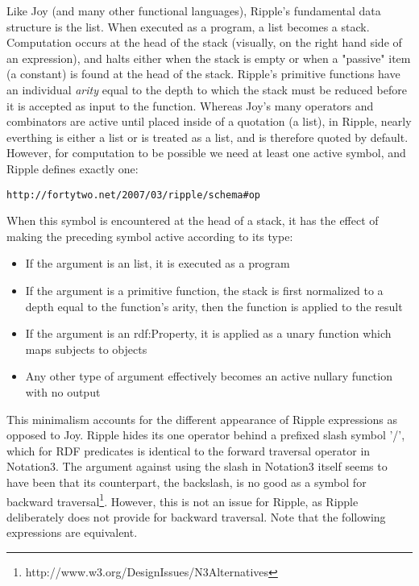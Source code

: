 \documentclass[runningheads]{llncs}
\begin{document}
Like Joy (and many other functional languages), Ripple's fundamental data structure is the list.  When executed as a program, a list becomes a stack.  Computation occurs at the head of the stack (visually, on the right hand side of an expression), and halts either when the stack is empty or when a "passive" item (a constant) is found at the head of the stack.  Ripple's primitive functions have an individual \textit{arity} equal to the depth to which the stack must be reduced before it is accepted as input to the function.  Whereas Joy's many operators and combinators are active until placed inside of a quotation (a list), in Ripple, nearly everthing is either a list or is treated as a list, and is therefore quoted by default.  However, for computation to be possible we need at least one active symbol, and Ripple defines exactly one:

\begin{verbatim}
http://fortytwo.net/2007/03/ripple/schema#op
\end{verbatim}

When this symbol is encountered at the head of a stack, it has the effect of making the preceding symbol active according to its type:
\begin{itemize}
\item If the argument is an list, it is executed as a program
\item If the argument is a primitive function, the stack is first normalized to a depth equal to the function's arity, then the function is applied to the result
\item If the argument is an rdf:Property, it is applied as a unary function which maps subjects to objects
\item Any other type of argument effectively becomes an active nullary function with no output
\end{itemize}

This minimalism accounts for the different appearance of Ripple expressions as opposed to Joy.  Ripple hides its one operator behind a prefixed slash symbol '/', which for RDF predicates is identical to the forward traversal operator in Notation3.  The argument against using the slash in Notation3 itself seems to have been that its counterpart, the backslash, is no good as a symbol for backward traversal\footnote{http://www.w3.org/DesignIssues/N3Alternatives}.  However, this is not an issue for Ripple, as Ripple deliberately does not provide for backward traversal.  Note that the following expressions are equivalent.
\end{document}
